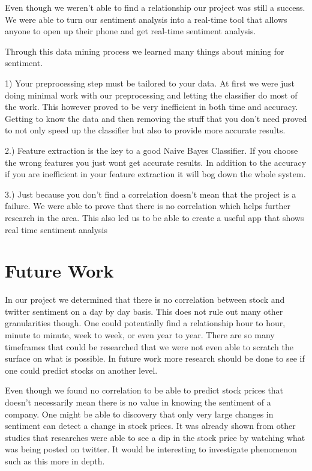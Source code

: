 \documentclass{acm_proc_article-sp}
\begin{document}
Even though we weren't able to find a relationship our project was still a success.
We were able to turn our sentiment analysis into a real-time tool that allows anyone
to open up their phone and get real-time sentiment analysis. 

Through this data mining process we learned many things about mining for sentiment.

1) Your preprocessing step must be tailored to your data. At first we were just doing
minimal work with our preprocessing and letting the classifier do most of the work. 
This however proved to be very inefficient in both time and accuracy. Getting to know
the data and then removing the stuff that you don't need proved to not only speed 
up the classifier but also to provide more accurate results.

2.) Feature extraction is the key to a good Naive Bayes Classifier. If you choose
the wrong features you just wont get accurate results. In addition to the accuracy
if you are inefficient in your feature extraction it will bog down the whole system. 

3.) Just because you don't find a correlation doesn't mean that the project is a failure.
We were able to prove that there is no correlation which helps further research in 
the area. This also led us to be able to create a useful app that shows real time 
sentiment analysis

\section{Future Work}

In our project we determined that there is no correlation between stock and
twitter sentiment on a day by day basis. This does not rule out many other
granularities though.  One could potentially find a relationship hour to hour,
minute to minute, week to week, or even year to year. There are so many
timeframes that could be researched that we were not even able to scratch the
surface on what is possible. In future work more research should be done to see
if one could predict stocks on another level. 

Even though we found no correlation to be able to predict stock prices that
doesn't necessarily mean there is no value in knowing the sentiment of a
company. One might be able to discovery that only very large changes in
sentiment can detect a change in stock prices.  It was already shown from other
studies that researches were able to see a dip in the stock price by watching
what was being posted on twitter. It would be interesting to investigate
phenomenon such as this more in depth.  
\end{document}

